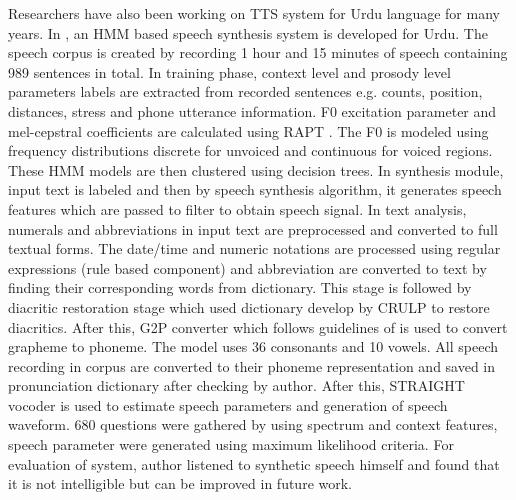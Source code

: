 Researchers have also been working on TTS system for Urdu language for many years. In \cite{ahmed2014hmm}, an HMM based speech synthesis system is developed for Urdu. The speech corpus is created by recording 1 hour and 15 minutes of speech containing 989 sentences in total. In training phase, context level and 
prosody level parameters labels are extracted from recorded sentences e.g. counts, position, distances, stress and phone utterance 
information. F0 excitation parameter and mel-cepstral coefficients are calculated using RAPT \cite{kleijn1995speech}. The F0 is modeled using frequency
distributions discrete for unvoiced and continuous for voiced regions. These HMM models are then clustered using decision
trees. In synthesis module, input text is labeled and then by speech synthesis algorithm, it generates speech features which
are passed to filter to obtain speech signal. In text analysis, numerals and abbreviations in input text are preprocessed and converted to full
textual forms. The date/time and numeric notations are processed using regular expressions (rule based component) and
abbreviation are converted to text by finding their corresponding words from dictionary. This stage is followed by diacritic 
restoration stage which used dictionary develop by CRULP \cite{crulp} to restore diacritics. After this, 
G2P converter which follows guidelines of \cite{hussain2004sound} is used to convert grapheme to phoneme. The model uses 36
consonants and 10 vowels. All speech recording in corpus are converted to their phoneme representation and saved in
pronunciation dictionary after checking by author. After this, STRAIGHT vocoder is used to estimate speech parameters and generation 
of speech waveform. 680 questions were gathered by using spectrum
and context features, speech parameter were generated using maximum likelihood criteria. For evaluation of system, author listened to
synthetic speech himself and found that it is not intelligible but can be improved in future work.

